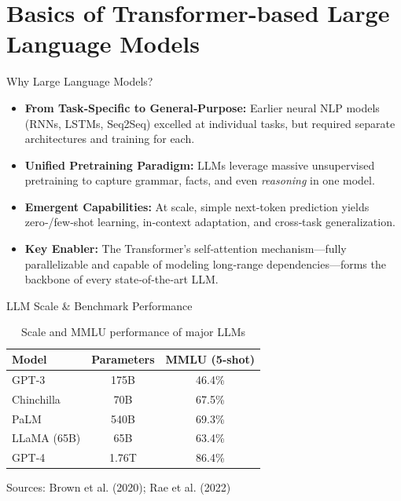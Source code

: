 \documentclass[german,10pt]{beamer}
\begin{document}
\section{Basics of Transformer-based Large Language Models}

\begin{frame}{Why Large Language Models?}
  \begin{itemize}
    \item \textbf{From Task‑Specific to General‑Purpose:}  
      Earlier neural NLP models (RNNs, LSTMs, Seq2Seq) excelled at individual tasks, but required separate architectures and training for each.  
    \item \textbf{Unified Pretraining Paradigm:}  
      LLMs leverage massive unsupervised pretraining to capture grammar, facts, and even \textit{ reasoning} in one model.  
    \item \textbf{Emergent Capabilities:}  
      At scale, simple next‑token prediction yields zero‑/few‑shot learning, in‑context adaptation, and cross‑task generalization.
    \item \textbf{Key Enabler:}  
      The Transformer’s self‑attention mechanism—fully parallelizable and capable of modeling long‑range dependencies—forms the backbone of every state‑of‑the‑art LLM.  
  \end{itemize}
\end{frame}


\begin{frame}{LLM Scale \& Benchmark Performance}
  \begin{table}[h!]
    \centering
    \begin{tabular}{lcc}
      \hline
      \textbf{Model} & \textbf{Parameters} & \textbf{MMLU (5-shot)} \\
      \hline
      GPT-3 & 175B & 46.4\% \\
      Chinchilla & 70B & 67.5\% \\
      PaLM & 540B & 69.3\% \\
      LLaMA (65B) & 65B & 63.4\% \\
      GPT-4 & 1.76T  & 86.4\% \\
      \hline
    \end{tabular}
    \caption{Scale and MMLU performance of major LLMs}
  \end{table}
  \vspace{0.5em}
  {\footnotesize Sources: Brown et al. (2020); Rae et al. (2022)} 
\end{frame}
\end{document}
